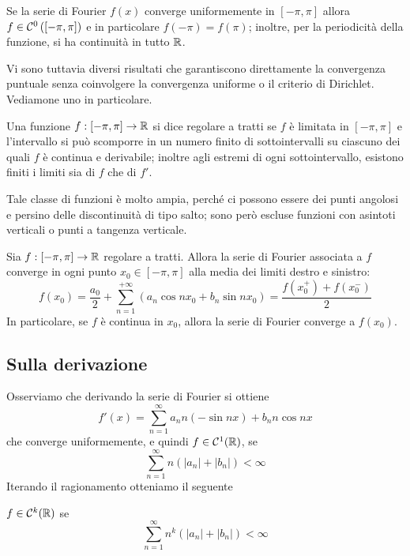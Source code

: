 \begin{thm}[Continuità]
Se la serie di Fourier $f(x)$ converge uniformemente in $[-\pi,\pi]$ allora $f\in\mathcal{C}^0\left([-\pi,\pi]\right)$ e in particolare $f(-\pi)=f(\pi)$; inoltre, per la periodicità della funzione, si ha continuità in tutto $\mathbb{R}$.
\end{thm}

Vi sono tuttavia diversi risultati che garantiscono direttamente la convergenza puntuale senza coinvolgere la convergenza uniforme o il criterio di Dirichlet. Vediamone uno in particolare.

\begin{defn}
Una funzione $f: [-\pi, \pi]\rightarrow \mathbb{R}$ si dice regolare a tratti se $f$ è limitata in $[-\pi, \pi]$ e l'intervallo si può scomporre in un numero finito di sottointervalli su ciascuno dei quali $f$ è continua e derivabile; inoltre agli estremi di ogni sottointervallo, esistono finiti i limiti sia di $f$ che di $f'$.
\end{defn}

Tale classe di funzioni è molto ampia, perché ci possono essere dei punti angolosi e persino delle discontinuità di tipo salto; sono però escluse funzioni con asintoti verticali o punti a tangenza verticale.

\begin{thm}
Sia $f: [ - \pi, \pi]\rightarrow \mathbb{R}$ regolare a tratti. Allora la serie di Fourier associata a $f$ converge in ogni punto $x_0\in [ - \pi, \pi]$ alla media dei limiti destro e sinistro:
$$
f(x_0)=\frac{a_0}{2}+\sum_{n=1}^{+\infty}\left(a_n\cos nx_0+b_n\sin nx_0\right)=\frac{f(x_0^+)+f(x_0^-)}{2}
$$
In particolare, se $f$ è continua in $x_0$, allora la serie di Fourier converge a $f(x_0)$.
\end{thm}

\subsection{Sulla derivazione}

Osserviamo che derivando la serie di Fourier si ottiene
\begin{equation*}
f'(x) = \sum\limits^{\infty}_{n = 1}a_nn(-\sin nx)+b_nn\cos nx
\end{equation*}
che converge uniformemente, e quindi $f\in\mathcal{C}^1(\mathbb{R})$, se
\begin{equation*}
\sum\limits^{\infty}_{n = 1} n(| a_{n}| + | b_{n}|) < \infty
\end{equation*} 
Iterando il ragionamento otteniamo il seguente
\begin{thm}[Derivabilità]
$f\in\mathcal{C}^k(\mathbb{R})$ se
\begin{equation*}
\sum\limits^{\infty}_{n = 1} n^{k}(| a_{n}| + | b_{n}|) < \infty
\end{equation*}
\end{thm}

